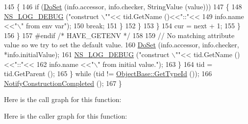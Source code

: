 \begin{DoxyCode}
145                         \{
146                           \textcolor{keywordflow}{if} (\hyperlink{classns3_1_1ObjectBase_afe5f2f7b2fabc99aa33f9bb434e3b695}{DoSet} (info.accessor, info.checker, StringValue (value)))
147                             \{
148                               \hyperlink{group__logging_ga413f1886406d49f59a6a0a89b77b4d0a}{NS\_LOG\_DEBUG} (\textcolor{stringliteral}{"construct \(\backslash\)""}<< tid.GetName ()<<\textcolor{stringliteral}{"::"}<<
149                                             info.name <<\textcolor{stringliteral}{"\(\backslash\)" from env var"});
150                               \textcolor{keywordflow}{break};
151                             \}
152                         \}
153                     \}
154                   cur = next + 1;
155                 \}
156             \}
157 \textcolor{preprocessor}{#endif }\textcolor{comment}{/* HAVE\_GETENV */}\textcolor{preprocessor}{}
158 
159           \textcolor{comment}{// No matching attribute value so we try to set the default value.}
160           \hyperlink{classns3_1_1ObjectBase_afe5f2f7b2fabc99aa33f9bb434e3b695}{DoSet} (info.accessor, info.checker, *info.initialValue);
161           \hyperlink{group__logging_ga413f1886406d49f59a6a0a89b77b4d0a}{NS\_LOG\_DEBUG} (\textcolor{stringliteral}{"construct \(\backslash\)""}<< tid.GetName ()<<\textcolor{stringliteral}{"::"}<<
162                         info.name <<\textcolor{stringliteral}{"\(\backslash\)" from initial value."});
163         \}
164       tid = tid.GetParent ();
165     \} \textcolor{keywordflow}{while} (tid != \hyperlink{classns3_1_1ObjectBase_a2b870298ebceaaeffc9d65e15c022eac}{ObjectBase::GetTypeId} ());
166   \hyperlink{classns3_1_1ObjectBase_aa349348317dbdb62a7ee1df89db1eb8b}{NotifyConstructionCompleted} ();
167 \}
\end{DoxyCode}


Here is the call graph for this function\+:




Here is the caller graph for this function\+:


